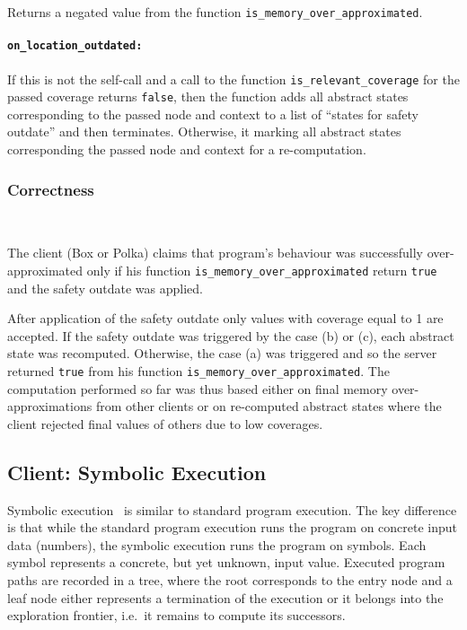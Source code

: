 \documentclass[envcountsame]{llncs}
\begin{document}
Returns a negated value from the function \texttt{is\_memory\_over\_approximated}.

\paragraph{\tt on\_location\_outdated: }

If this is not the self-call and a call to the function
\texttt{is\_relevant\_coverage} for the passed coverage returns \texttt{false},
then the function adds all abstract states corresponding to the passed node and
context to a list of ``states for safety outdate'' and then terminates.
Otherwise, it marking all abstract states corresponding the passed node and
context for a re-computation.

\subsubsection{Correctness}~\\
\label{sec:CorrectnessBoxPolka}

The client (Box or Polka) claims that program's behaviour was successfully
over-approximated only if his function \texttt{is\_memory\_over\_approximated}
return \texttt{true} and the safety outdate was applied.

After application of the safety outdate only values with coverage equal to 1 are
accepted. If the safety outdate was triggered by the case (b) or (c), each
abstract state was recomputed. Otherwise, the case (a) was triggered and so the
server returned \texttt{true} from his function
\texttt{is\_memory\_over\_approximated}. The computation performed so far was
thus based either on final memory over-approximations from other clients or on
re-computed abstract states where the client rejected final values of others due
to low coverages.


\subsection{Client: Symbolic Execution}
\label{sec:SymbolicExecution}

Symbolic execution~\cite{SE_King76} is similar to standard program execution.
The key difference is that while the standard program execution runs the program
on concrete input data (numbers), the symbolic execution runs the program on
symbols. Each symbol represents a concrete, but yet unknown, input value.
Executed program paths are recorded in a tree, where the root corresponds to the
entry node and a leaf node either represents a termination of the execution or
it belongs into the exploration frontier, i.e.~it remains to compute its
successors.
\end{document}
